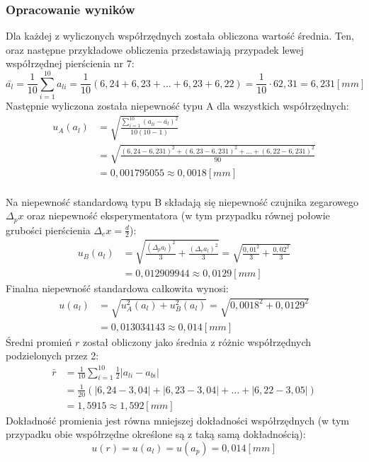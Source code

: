 \documentclass[polish, 11pt, a4paper]{article}
\begin{document}
	\subsubsection{Opracowanie wyników}
		Dla każdej z wyliczonych współrzędnych została obliczona wartość średnia.
		Ten, oraz następne przykładowe obliczenia przedstawiają przypadek lewej współrzędnej pierścienia nr 7:
		\begin{displaymath}
		\bar{a_l}=\frac{1}{10}\sum_{i=1}^{10}a_{li}=\frac{1}{10}(6,24+6,23+\dots+6,23+6,22)=\frac{1}{10}\cdot 62,31=6,231 [mm]
		\end{displaymath}
		Następnie wyliczona została niepewność typu A dla wszystkich współrzędnych:\\
		\begin{align*}
		u_A(a_l)&=\sqrt{\frac{\sum_{i=1}^{10} (a_{li}-\bar{a_l})^2}{10(10-1)}}\\
				&=\sqrt{\frac{(6,24-6,231)^2+(6,23-6,231)^2+\dots+(6,22-6,231)^2}{90}}\\
				&=0,001795055\approx 0,0018 [mm]
		\end{align*}\\
		Na niepewność standardową typu B składają się niepewność czujnika zegarowego \(\Delta{_px}\) oraz niepewność eksperymentatora (w tym przypadku równej połowie grubości pierścienia \(\Delta{_ex}=\frac{d}{2}\)):
		\begin{align*}
		u_B(a_l)	&=\sqrt{\frac{(\Delta{_pa_l})^2}{3}+\frac{(\Delta{_ea_l})^2}{3}}=\sqrt{\frac{0,01^2}{3}+\frac{0,02^2}{3}}\\
					&=0,012909944\approx 0,0129[mm]
		\end{align*}
		Finalna niepewność standardowa całkowita wynosi:
		\begin{align*}
		u(a_l)	&=\sqrt{u_A^2(a_l)+u_B^2(a_l)}=\sqrt{0,0018^2+0,0129^2}\\
				&=0,013034143\approx 0,014[mm]
		\end{align*}
		Średni promień \(r\) został obliczony jako średnia z różnic współrzędnych podzielonych przez 2:
		\begin{align*}
		\bar{r}	&=\frac{1}{10}\sum_{i=1}^{10}\frac{1}{2}|a_{li}-a_{bi}|\\
				&=\frac{1}{20}(|6,24-3,04|+|6,23-3,04|+\dots+|6,22-3,05|)\\
				&=1,5915\approx 1,592[mm]
		\end{align*}
		Dokładność promienia jest równa mniejszej dokładności współrzędnych
		(w tym przypadku obie współrzędne określone są z taką samą dokładnością):
		\begin{displaymath}
		u(r)=u(a_l)=u(a_p)=0,014[mm]
		\end{displaymath}
\end{document}
